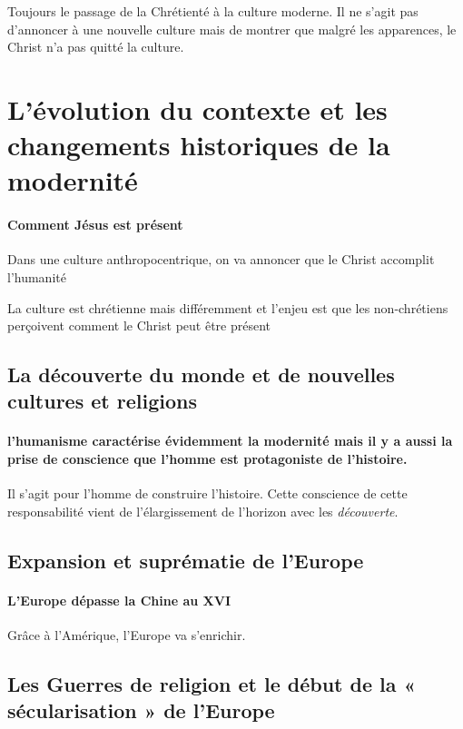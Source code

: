 Toujours le passage de la Chrétienté à la culture moderne. Il ne s'agit pas d'annoncer à une nouvelle culture mais de montrer que malgré les apparences, le Christ n'a pas quitté la culture.




\section{L’évolution du contexte et les changements historiques de la modernité}
\paragraph{Comment Jésus est présent} Dans une culture anthropocentrique, on va annoncer que le Christ accomplit l'humanité
\begin{Synthesis}
La culture est chrétienne mais différemment et l'enjeu est que les non-chrétiens perçoivent comment le Christ peut être présent
\end{Synthesis}

\subsection{La découverte du monde et de nouvelles cultures et religions }



\paragraph{l'humanisme caractérise évidemment la modernité mais il y a aussi la prise de conscience que l'homme est protagoniste de l'histoire.} Il s'agit pour l'homme de construire l'histoire. Cette conscience de cette responsabilité vient de l'élargissement de l'horizon avec les \textit{découverte}.

\subsection{Expansion et suprématie de l’Europe }
\paragraph{L'Europe dépasse la Chine au XVI} Grâce à l'Amérique, l'Europe va s'enrichir.

\subsection{Les Guerres de religion et le début de la « sécularisation » de l’Europe }

